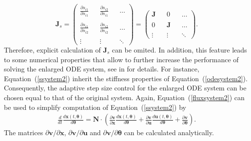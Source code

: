 \documentclass[12pt,a4paper]{scrartcl}
\newcommand{\dd}[2]{\frac{\partial #1}{\partial #2}}
\newcommand{\DD}[2]{\frac{d #1}{d #2}}
\begin{document}
\begin{displaymath}
\mathbf{J}_s = \left( 
\begin{array}{ccccc}
\dd{s_{i1}}{s_{i1}} & & \dd{s_{i2}}{s_{i1}} & & \ldots \\
\\
\dd{s_{i1}}{s_{i2}} & & \dd{s_{i2}}{s_{i2}}& & \ldots \\
\\
\vdots & & \vdots & & \ddots
\end{array} 
\right) = \left( 
\begin{array}{ccccc}
\mathbf{J} & & 0 & & \ldots \\
\\
0 & & \mathbf{J}& & \ldots \\
\\
\vdots & & \vdots & & \ddots
\end{array} 
\right).
\end{displaymath}
Therefore, explicit calculation of $\mathbf{J}_s$ can be omited. In addition, this feature leads to some 
numerical properties that allow to further increase the performance of solving the enlarged ODE system, 
see in \cite{Hindmarsh:2005fb} for details. For instance, Equation~(\ref{ssystem2}) inherit the stiffness 
properties of Equation~(\ref{odesystem2}). Consequently, the adaptive step size control for the enlarged 
ODE system can be chosen equal to that of the original system. Again, Equation~(\ref{fluxsystem2}) can be 
used to simplify computation of Equation~(\ref{ssystem2}) by 
\begin{eqnarray}
	\DD{}{t} \DD{\mathbf{x}(t,\boldsymbol{\theta})}{\boldsymbol{\theta}}  =  \mathbf{N}\cdot 
\left(  \dd{\mathbf{v}}{\mathbf{x}}  \DD{\mathbf{x}(t,\boldsymbol{\theta})}{\boldsymbol{\theta}} +  
\dd{\mathbf{v}}{\mathbf{u}}  \DD{\mathbf{u}(t,\boldsymbol{\theta})}{\boldsymbol{\theta}} + \dd{\mathbf{v}}
{\boldsymbol{\theta}} \right). \label{ssystemflux}
\end{eqnarray}
The matrices $\partial{\mathbf{v}}/\partial{\mathbf{x}}$, $\partial{\mathbf{v}}/\partial{\mathbf{u}}$ and $
\partial{\mathbf{v}}/\partial{\boldsymbol{\theta}}$ can be calculated analytically.

\renewcommand{\bibname}{References}
\renewcommand{\bibfont}{\small}


\end{document}
